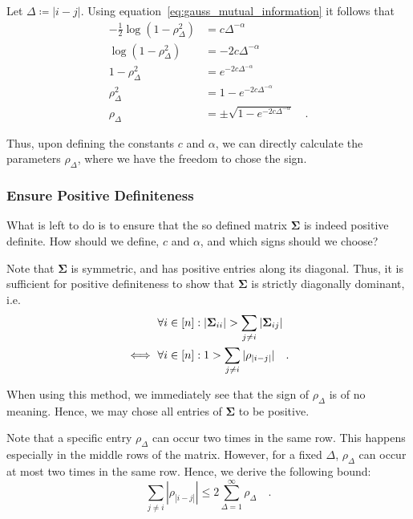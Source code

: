 \documentclass[../../main.tex]{subfiles}
\begin{document}
Let $\Delta \coloneqq |i-j|$. Using equation~\eqref{eq:gauss_mutual_information} it follows that
\begin{align*}
    -\frac{1}{2}\log(1-\rho_\Delta^2) &= c \Delta^{-\alpha} \\
    \log(1-\rho_\Delta^2) &= -2c \Delta^{-\alpha} \\
    1-\rho_\Delta^2 &= e^{-2c \Delta^{-\alpha}} \\
    \rho_\Delta^2 &= 1 - e^{-2c \Delta^{-\alpha}} \\
    \rho_\Delta &= \pm \sqrt{1 - e^{-2c \Delta^{-\alpha}}} \quad .
\end{align*}

Thus, upon defining the constants $c$ and $\alpha$, we can directly calculate the parameters $\rho_\Delta$, where we have the freedom to chose the sign.

\subsubsection{Ensure Positive Definiteness}
What is left to do is to ensure that the so defined matrix $\bm{\Sigma}$ is indeed positive definite. How should we define, $c$ and $\alpha$, and which signs should we choose?

Note that $\bm{\Sigma}$ is symmetric, and has positive entries along its diagonal. Thus, it is sufficient for positive definiteness to show that $\bm{\Sigma}$ is strictly diagonally dominant, i.e.
\begin{align}
    &\forall i \in [n]: |\bm{\Sigma}_{ii}| > \sum_{j \neq i} |\bm{\Sigma}_{ij}| \notag \\
    \iff \ &\forall i \in [n]: 1 > \sum_{j \neq i} |\rho_{|i-j|}| \quad . \label{eq:diagonal_dominant}
\end{align}

When using this method, we immediately see that the sign of $\rho_\Delta$ is of no meaning. Hence, we may chose all entries of $\bm{\Sigma}$ to be positive.

Note that a specific entry $\rho_\Delta$ can occur two times in the same row. This happens especially in the middle rows of the matrix. However, for a fixed $\Delta$, $\rho_\Delta$ can occur at most two times in the same row. Hence, we derive the following bound:
\begin{equation}
    \sum_{j \neq i} |\rho_{|i-j|}| \leq 2 \sum_{\Delta = 1}^{\infty} \rho_\Delta \quad . \label{eq:diagonal_dominant_sufficient}
\end{equation}
\end{document}
